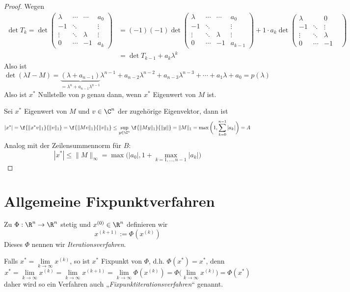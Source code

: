 \documentclass[11pt]{scrbook}
\begin{document}
\begin{st}
\begin{proof}
		Wegen
		\begin{align*}
			\det T_k = \det \begin{pmatrix}
				\lambda & \cdots & \cdots & a_0 \\
				-1 & \ddots &  &\vdots \\
				\vdots & \ddots & \lambda &\vdots \\
				0 & \cdots & -1 & a_k 
			\end{pmatrix}
			&= (-1)(-1) 
			\det \begin{pmatrix}
				\lambda & \cdots & \cdots & a_0 \\
				-1 & \ddots &  &\vdots \\
				\vdots & \ddots & \lambda &\vdots \\
				0 & \cdots & -1 & a_{k-1} 
			\end{pmatrix}
			+ 1 \cdot a_k 
			\det \begin{pmatrix}
				\lambda & &  0 \\
				-1 & \ddots &  \vdots \\
				\vdots & \ddots & \lambda  \\
				0 & \cdots & -1 & 
			\end{pmatrix} \\
			&= \det T_{k-1} + a_k \lambda^k
		\end{align*}
		Also ist
		\[
			\det(\lambda I-M) = \underbrace{(\lambda +a_{n-1})}_{=\lambda^n + a_{n-1}\lambda^{n-1}} \lambda^{n-1} + a_{n-2} \lambda^{n-2} + a_{n-3}\lambda^{n-3} + \dotsb + a_1 \lambda + a_0 = p(\lambda)
		\]
		Also ist $x^*$ Nullstelle von $p$ genau dann, wenn $x^*$ Eigenwert von $M$ ist.

		Sei $x^*$ Eigenwert von $M$ und $v\in \C^n$ der zugehörige Eigenvektor, dann ist
		\[
			|x^*| 
			= \f {\|x^*v\|_1}{\|v\|_1} 
			= \f {\|Mv\|_1}{\|v\|_1}
			\le \sup_{y\in\C^n} \f {\|My\|_1}{\|y\|}
			= \|M\|_1
			= \max\bigg(1, \sum_{k=0}^{n-1} |a_k| \bigg)
			= A
		\]
		Analog mit der Zeilensummennorm für $B$:
		\[
			|x^*| \le \|M\|_\infty = \max\Big( |a_0|, 1 + \max_{k=1,\dotsc,n-1} |a_k| \Big)
		\]
	\end{proof}
\end{st}

\section{Allgemeine Fixpunktverfahren}

\begin{df}[Iterationsverfahren] \label{3.10}
	Zu $\Phi: \R^n \to \R^n$ stetig und $x^{(0)} \in \R^n$ definieren wir
	\[
		x^{(k+1)} := \Phi(x^{(k)})
	\]
	Dieses $\Phi$ nennen wir \emph{Iterationsverfahren}.
	\begin{note}
		Falls $x^* = \lim\limits_{k\to \infty} x^{(k)}$, so ist $x^*$ Fixpunkt von $\Phi$, d.h. $\Phi(x^*) = x^*$, denn
		\[
			x^* = \lim_{k\to \infty} x^{(k)} = \lim_{k\to \infty} x^{(k+1)} = \lim_{k\to \infty} \Phi(x^{(k)}) = \Phi\Big(\lim_{k\to \infty} x^{(k)}\Big) = \Phi(x^*)
		\]
		daher wird so ein Verfahren auch „\emph{Fixpunktiterationsverfahren}“ genannt.
	\end{note}
\end{df}
\end{document}
